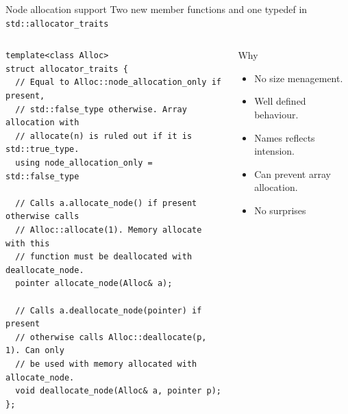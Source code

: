 \documentclass[10pt,aspectratio=169]{beamer}
\begin{document}
\begin{frame}[fragile]
{Node allocation support}
{Two new member functions and one typedef in \texttt{std::allocator\_traits}}

\begin{columns}
\begin{column}{0.60\textwidth}
\begin{lstlisting}
template<class Alloc>
struct allocator_traits {
  // Equal to Alloc::node_allocation_only if present,
  // std::false_type otherwise. Array allocation with
  // allocate(n) is ruled out if it is std::true_type.
  using node_allocation_only = std::false_type

  // Calls a.allocate_node() if present otherwise calls
  // Alloc::allocate(1). Memory allocate with this
  // function must be deallocated with deallocate_node.
  pointer allocate_node(Alloc& a);

  // Calls a.deallocate_node(pointer) if present
  // otherwise calls Alloc::deallocate(p, 1). Can only
  // be used with memory allocated with allocate_node.
  void deallocate_node(Alloc& a, pointer p);
};
\end{lstlisting}
\end{column}

\begin{column}{0.40\textwidth}
\begin{block}{Why}
\begin{itemize}
\item No size menagement.
\item Well defined behaviour.
\item Names reflects intension.
\item Can prevent array allocation.
\item {\color{alertc}No surprises}
\end{itemize}
\end{block}
\end{column}

\end{columns}

\end{frame}
\end{document}
